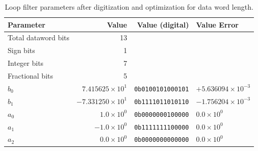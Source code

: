 \begin{table}[h!]
	\centering
	\def\arraystretch{1.5}		
	\setlength\arrayrulewidth{0.75pt}
	\setlength{\tabcolsep}{1em} %
	\begin{tabular}{|l|r|r|l|}
		\hline 
		\rule[-1ex]{0pt}{2.5ex} \cellcolor{gray!40}\textbf{Parameter} & \cellcolor{gray!40}\textbf{Value} & \cellcolor{gray!40}\textbf{Value (digital) } & \cellcolor{gray!40}\textbf{Value Error}\\ 
		\hline 
		\rule[-1ex]{0pt}{2.5ex} Total dataword bits  & 13 & & \\ 
		\hline 
		\rule[-1ex]{0pt}{2.5ex} Sign bits  & 1 & & \\ 
		\hline 
		\rule[-1ex]{0pt}{2.5ex} Integer bits & 7 & & \\ 
		\hline 
		\rule[-1ex]{0pt}{2.5ex} Fractional bits  & 5 & & \\ 
		\hline 
		\rule[-1ex]{0pt}{2.5ex} \textbf{$b_0$} & $7.415625\times10^1$ & \texttt{0b0100101000101}  & $+5.636094\times10^{-3}$\\ 
		\hline 
		\rule[-1ex]{0pt}{2.5ex} \textbf{$b_1$}  & $-7.331250\times10^1$ & \texttt{0b1111011010110}  & $-1.756204\times10^{-3}$\\ 
		\hline 
		\rule[-1ex]{0pt}{2.5ex} \textbf{$a_0$}  & $1.0\times10^0$ & \texttt{0b0000000100000} & $0.0\times10^0$ \\ 
		\hline 
		\rule[-1ex]{0pt}{2.5ex} \textbf{$a_1$}  & $-1.0\times10^0$ & \texttt{0b1111111100000} & $0.0\times10^0$ \\ 
		\hline 
		\rule[-1ex]{0pt}{2.5ex} \textbf{$a_2$}  & $0.0\times10^0$ & \texttt{0b0000000000000} & $0.0\times10^0$ \\ 
		\hline 
	\end{tabular} 
	\caption{Loop filter parameters after digitization and optimization for data word length.}
	\label{dig_filter_params}
\end{table}  

